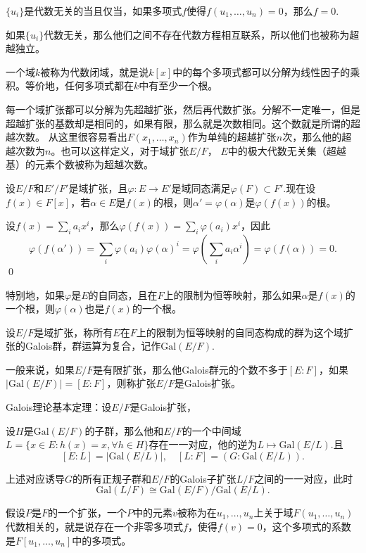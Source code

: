 \pro $\{u_i\}$是代数无关的当且仅当，如果多项式$f$使得$f(u_1,\dots ,u_n)=0$，那么$f=0$.

如果$\{u_i\}$代数无关，那么他们之间不存在代数方程相互联系，所以他们也被称为超越独立。

\para 一个域$k$被称为代数闭域，就是说$k[x]$中的每个多项式都可以分解为线性因子的乘积。等价地，任何多项式都在$k$中有至少一个根。

每一个域扩张都可以分解为先超越扩张，然后再代数扩张。分解不一定唯一，但是超越扩张的基数却是相同的，如果有限，那么就是次数相同。这个数就是所谓的超越次数。 从这里很容易看出$F(x_1,\dots ,x_n)$作为单纯的超越扩张$n$次，那么他的超越次数为$n$。也可以这样定义，对于域扩张$E/F$， $E$中的极大代数无关集（超越基）的元素个数被称为超越次数。

\lem 设$E/F$和$E'/F'$是域扩张，且$\varphi:E\to E'$是域同态满足$\varphi(F)\subset F'$.现在设$f(x)\in F[x]$，若$\alpha\in E$是$f(x)$的根，则$\alpha'=\varphi(\alpha)$是$\varphi(f(x))$的根。

\proof 设$f(x)=\sum_i a_i x^i$，那么$\varphi(f(x))=\sum_i \varphi(a_i) x^i$，因此
\[
	\varphi(f(\alpha'))=\sum_i \varphi(a_i) \varphi(\alpha)^i=\varphi\left(\sum_i a_i\alpha^i\right)=\varphi\left(f(\alpha)\right)=0.
\]\qed

特别地，如果$\varphi$是$E$的自同态，且在$F$上的限制为恒等映射，那么如果$\alpha$是$f(x)$的一个根，则$\varphi(\alpha)$也是$f(x)$的一个根。

\para 设$E/F$是域扩张，称所有$E$在$F$上的限制为恒等映射的自同态构成的群为这个域扩张的Galois群，群运算为复合，记作$\mathrm{Gal}(E/F)$.

一般来说，如果$E/F$是有限扩张，那么他Galois群元的个数不多于$[E:F]$，如果$|\mathrm{Gal}(E/F)|=[E:F]$，则称扩张$E/F$是Galois扩张。

\theo Galois理论基本定理：设$E/F$是Galois扩张，

 设$H$是$\mathrm{Gal}(E/F)$的子群，那么他和$E/F$的一个中间域$L=\{x\in E:h(x)=x,\forall h\in H\}$存在一一对应，他的逆为$L\mapsto \mathrm{Gal}(E/L)$.且
\[
[E:L]=|\mathrm{Gal}(E/L)|,\quad [L:F]=(G:\mathrm{Gal}(E/L)).
\]

 上述对应诱导$G$的所有正规子群和$E/F$的Galois子扩张$L/F$之间的一一对应，此时
\[
	\mathrm{Gal}(L/F)\cong \mathrm{Gal}(E/F)/\mathrm{Gal}(E/L).
\]

\para 假设$P$是$F$的一个扩张，一个$P$中的元素$v$被称为在$u_1,\dots ,u_n$上关于域$F(u_1,\dots ,u_n)$代数相关的，就是说存在一个非零多项式$f$，使得$f(v)=0$，这个多项式的系数是$F[u_1,\dots ,u_n]$中的多项式。